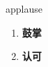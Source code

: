 
\begin{frame}
{\huge applause}
\begin{center}
\begin{enumerate}\Large
  \item \textbf{鼓掌}
  \item \textbf{认可}
\end{enumerate}
\end{center}
\end{frame}
